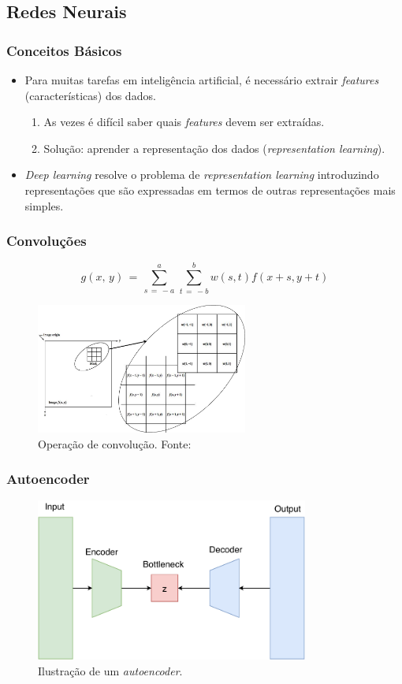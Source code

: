 \documentclass{beamer}
\begin{document}
\subsection{Redes Neurais}
\begin{frame}
\frametitle{Conceitos Básicos}
\begin{itemize}
\item Para muitas tarefas em inteligência artificial, é necessário extrair \textit{features} (características) dos dados.
\begin{enumerate}
\item As vezes é difícil saber quais \textit{features} devem ser extraídas.
\item Solução: aprender a representação dos dados (\textit{representation learning}).
\end{enumerate}
\item \textit{Deep learning} resolve o problema de \textit{representation learning} introduzindo representações que são expressadas em termos de outras representações mais simples.
\end{itemize} 
\end{frame}
\begin{frame}
\frametitle{Convoluções}
\begin{equation} g(x,\, y) \,=\, \sum_{s\, =\, -a}^{a}\, \sum_{t\, =\, -b}^{b}{w(s,t)f(x + s, y + t)} \end{equation}
\begin{figure}
\includegraphics[width=0.62\textwidth]{figs/conv.pdf}
\caption{Operação de convolução. Fonte:~\cite{ipi}}
\end{figure}
\end{frame}
\begin{frame}
\frametitle{Autoencoder}
\begin{figure}
\includegraphics[width=0.8\textwidth]{figs/autoencoder.pdf}
\caption{Ilustração de um \textit{autoencoder}.}
\end{figure}
\end{frame}
\end{document}
